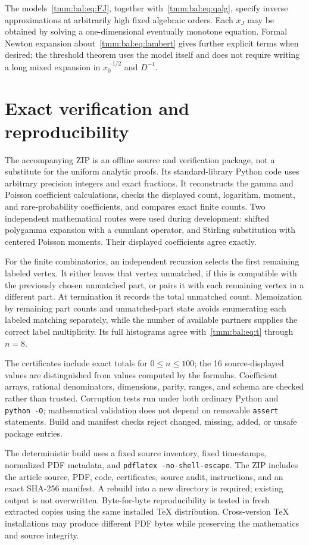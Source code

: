 \documentclass[11pt,letterpaper]{article}
\theoremstyle{remark}\newtheorem{remark}[theorem]{Remark}
\begin{document}
The models~\eqref{tmm:bal:eq:FJ}, together with~\eqref{tmm:bal:eq:qalg}, specify inverse approximations at arbitrarily high fixed algebraic orders. Each $x_J$ may be obtained by solving a one-dimensional eventually monotone equation. Formal Newton expansion about~\eqref{tmm:bal:eq:lambert} gives further explicit terms when desired; the threshold theorem uses the model itself and does not require writing a long mixed expansion in $x_0^{-1/2}$ and $D^{-1}$.

\section{Exact verification and reproducibility}\label{tmm:bal:sec:verification}
The accompanying ZIP is an offline source and verification package, not a substitute for the uniform analytic proofs. Its standard-library Python code uses arbitrary precision integers and exact fractions. It reconstructs the gamma and Poisson coefficient calculations, checks the displayed count, logarithm, moment, and rare-probability coefficients, and compares exact finite counts. Two independent mathematical routes were used during development: shifted polygamma expansion with a cumulant operator, and Stirling substitution with centered Poisson moments. Their displayed coefficients agree exactly.

For the finite combinatorics, an independent recursion selects the first remaining labeled vertex. It either leaves that vertex unmatched, if this is compatible with the previously chosen unmatched part, or pairs it with each remaining vertex in a different part. At termination it records the total unmatched count. Memoization by remaining part counts and unmatched-part state avoids enumerating each labeled matching separately, while the number of available partners supplies the correct label multiplicity. Its full histograms agree with~\eqref{tmm:bal:eq:t} through $n=8$.

The certificates include exact totals for $0\le n\le100$; the 16 source-displayed values are distinguished from values computed by the formulas. Coefficient arrays, rational denominators, dimensions, parity, ranges, and schema are checked rather than trusted. Corruption tests run under both ordinary Python and \texttt{python -O}; mathematical validation does not depend on removable \texttt{assert} statements. Build and manifest checks reject changed, missing, added, or unsafe package entries.

The deterministic build uses a fixed source inventory, fixed timestamps, normalized PDF metadata, and \texttt{pdflatex -no-shell-escape}. The ZIP includes the article source, PDF, code, certificates, source audit, instructions, and an exact SHA-256 manifest. A rebuild into a new directory is required; existing output is not overwritten. Byte-for-byte reproducibility is tested in fresh extracted copies using the same installed TeX distribution. Cross-version TeX installations may produce different PDF bytes while preserving the mathematics and source integrity.
\end{document}
